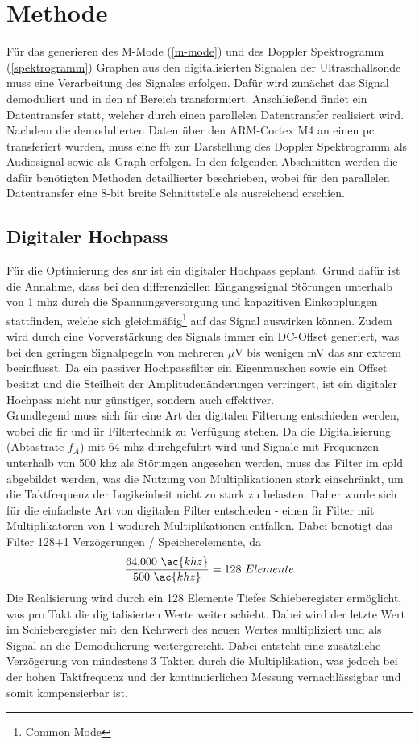 \section{Methode}
Für das generieren des M-Mode (\ref{m-mode}) und des Doppler Spektrogramm (\ref{spektrogramm}) Graphen aus den digitalisierten Signalen der Ultraschallsonde muss eine Verarbeitung des Signales erfolgen. Dafür wird zunächst das Signal demoduliert und in den \ac{nf} Bereich transformiert. Anschließend findet ein Datentransfer statt, welcher durch einen parallelen Datentransfer realisiert wird. Nachdem die demodulierten Daten über den ARM-Cortex M4 an einen \ac{pc} transferiert wurden, muss eine \ac{fft} zur Darstellung des Doppler Spektrogramm als Audiosignal sowie als Graph erfolgen. In den folgenden Abschnitten werden die dafür benötigten Methoden detaillierter beschrieben, wobei für den parallelen Datentransfer eine 8-bit breite Schnittstelle als ausreichend erschien.
\subsection{Digitaler Hochpass}\label{sec_digHP}
Für die Optimierung des \ac{snr} ist ein digitaler Hochpass geplant. Grund dafür ist die Annahme, dass bei den differenziellen Eingangssignal Störungen unterhalb von 1 \ac{mhz} durch die Spannungsversorgung und kapazitiven Einkopplungen stattfinden, welche sich gleichmäßig\footnote{Common Mode} auf das Signal auswirken können. Zudem wird durch eine Vorverstärkung des Signals immer ein DC-Offset generiert, was bei den geringen Signalpegeln von mehreren $\mu$V bis wenigen mV das \ac{snr} extrem beeinflusst. Da ein passiver Hochpassfilter ein Eigenrauschen sowie ein Offset besitzt und die Steilheit der Amplitudenänderungen verringert, ist ein digitaler Hochpass nicht nur günstiger, sondern auch effektiver.\\
Grundlegend muss sich für eine Art der digitalen Filterung entschieden werden, wobei die \ac{fir} und \ac{iir} Filtertechnik zu Verfügung stehen. Da die Digitalisierung (Abtastrate $f_A$) mit 64 \ac{mhz} durchgeführt wird und Signale mit Frequenzen unterhalb von 500 \ac{khz} als Störungen angesehen werden, muss das Filter im \ac{cpld} abgebildet werden, was die Nutzung von Multiplikationen stark einschränkt, um die Taktfrequenz der Logikeinheit nicht zu stark zu belasten. Daher wurde sich für die einfachste Art von digitalen Filter entschieden - einen \ac{fir} Filter mit Multiplikatoren von 1 wodurch Multiplikationen entfallen. Dabei benötigt das Filter 128+1 Verzögerungen / Speicherelemente, da 
\[\dfrac{64.000\ \ac{khz}}{500\ \ac{khz}}=128\ Elemente\]
Die Realisierung wird durch ein 128 Elemente Tiefes Schieberegister ermöglicht, was pro Takt die digitalisierten Werte weiter schiebt. Dabei wird der letzte Wert im Schieberegister mit den Kehrwert des neuen Wertes multipliziert und als Signal an die Demodulierung weitergereicht. Dabei entsteht eine zusätzliche Verzögerung von mindestens 3 Takten durch die Multiplikation, was jedoch bei der hohen Taktfrequenz und der kontinuierlichen Messung vernachlässigbar und somit kompensierbar ist.


